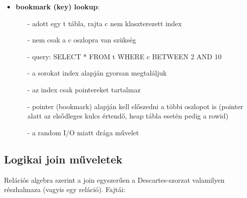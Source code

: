 \documentclass[12pt]{article}
\theoremstyle{plain}
\begin{document}
\begin{itemize}
    \item \textbf{bookmark (key) lookup}:
        \begin{itemize}
            \item[-] adott egy t tábla, rajta c nem klaszterezett index
            \item[-] nem csak a c oszlopra van szükség
            \item[-] query: SELECT * FROM t WHERE c BETWEEN 2 AND 10
            \item[-] a sorokat index alapján gyorsan megtaláljuk
            \item[-] az index csak pointereket tartalmaz
            \item[-] pointer (bookmark) alapján kell előszedni a többi oszlopot is (pointer alatt az elsődleges kulcs értendő, heap tábla esetén pedig a rowid)
            \item[-] a random I/O miatt drága művelet
        \end{itemize}{}
        
\end{itemize}{}
\subsection{Logikai join műveletek}

Relációs algebra szerint a join egyszerűen a Descartes-szorzat valamilyen részhalmaza (vagyis egy reláció). Fajtái:
\end{document}
